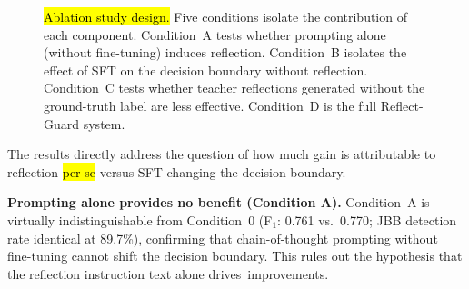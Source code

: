 \documentclass[superintelligence,article,accept,moreauthors]{Definitions/mdpi}
\begin{document}
\begin{figure}[H]
{}%
\caption{\hl{Ablation study design.} %
Five conditions isolate the contribution of each component.
Condition~A tests whether prompting alone (without fine-tuning) induces reflection.
Condition~B isolates the effect of SFT on the decision boundary without reflection.
Condition~C tests whether teacher reflections generated without the ground-truth label are less effective.
Condition~D is the full Reflect-Guard system.\label{fig:ablation}}
\end{figure}






\vspace{-6pt}



\vspace{-5pt}

The results directly address the question of how much gain is attributable to reflection \hl{per se} %
 versus SFT changing the decision boundary.

\textbf{Prompting alone provides no benefit (Condition A).}
Condition~A is virtually indistinguishable from Condition~0 (F$_1$: 0.761 vs.\ 0.770; JBB detection rate identical at 89.7\%), confirming that chain-of-thought prompting without fine-tuning cannot shift the decision boundary. This rules out the hypothesis that the reflection instruction text alone \mbox{drives improvements.}
\end{document}
